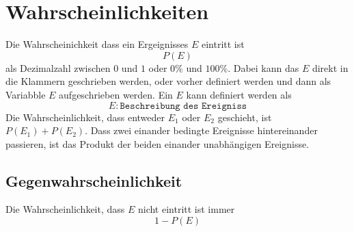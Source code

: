 \documentclass{article}
\begin{document}
 
\section{Wahrscheinlichkeiten} 
Die Wahrscheinichkeit dass ein Ergeignisses $E$ eintritt ist
\[
 P(E) 
\]
als Dezimalzahl zwischen $0$ und $1$ oder $0\%$ und $100\%$. Dabei kann das $E$ direkt in die Klammern geschrieben werden, oder vorher definiert werden und dann als Variabble $E$ aufgeschrieben werden. Ein $E$ kann definiert werden als
\[
 E : \texttt{Beschreibung des Ereigniss} 
\]
Die Wahrscheinlichkeit, dass entweder $E_1$ oder $E_2$ geschieht, ist $P(E_1) + P(E_2)$. Dass zwei einander bedingte Ereignisse hintereinander passieren, ist das Produkt der beiden einander unabhängigen Ereignisse.
 
\subsection{Gegenwahrscheinlichkeit}
Die Wahrscheinlichkeit, dass $E$ nicht eintritt ist immer
\[
 1 - P(E) 
\] 
 
\end{document}
